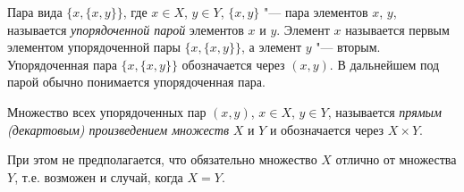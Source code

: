 \begin{defn}
Пара вида $\{x,\{x,y\}\}$, где $x\in X$, $y\in Y$, $\{x,y\}$ "--- пара элементов $x$, $y$, называется \textit{упорядоченной парой} элементов $x$ и $y$. Элемент $x$ называется первым элементом упорядоченной пары $\{x,\{x,y\}\}$, а элемент $y$ "--- вторым. Упорядоченная пара $\{x,\{x,y\}\}$ обозначается через $(x,y)$. В дальнейшем под парой обычно понимается упорядоченная пара.
\end{defn}

\begin{defn}
Множество всех упорядоченных пар $(x,y)$, $x\in X$, $y \in Y$, называется \textit{прямым (декартовым) произведением множеств} $X$ и $Y$ и обозначается через $X\times Y$. 
\end{defn}
При этом не предполагается, что обязательно множество $X$ отлично от множества $Y$, т.е. возможен и случай, когда $X = Y$.